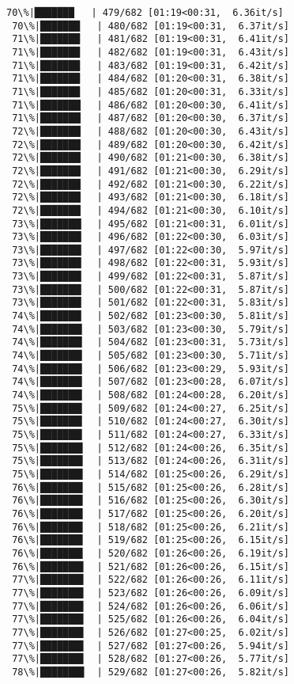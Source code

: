 \documentclass[11pt]{article}
\begin{document}
\begin{Verbatim}[commandchars=\\\{\}]
 70\%|███████   | 479/682 [01:19<00:31,  6.36it/s]
 70\%|███████   | 480/682 [01:19<00:31,  6.37it/s]
 71\%|███████   | 481/682 [01:19<00:31,  6.41it/s]
 71\%|███████   | 482/682 [01:19<00:31,  6.43it/s]
 71\%|███████   | 483/682 [01:19<00:31,  6.42it/s]
 71\%|███████   | 484/682 [01:20<00:31,  6.38it/s]
 71\%|███████   | 485/682 [01:20<00:31,  6.33it/s]
 71\%|███████▏  | 486/682 [01:20<00:30,  6.41it/s]
 71\%|███████▏  | 487/682 [01:20<00:30,  6.37it/s]
 72\%|███████▏  | 488/682 [01:20<00:30,  6.43it/s]
 72\%|███████▏  | 489/682 [01:20<00:30,  6.42it/s]
 72\%|███████▏  | 490/682 [01:21<00:30,  6.38it/s]
 72\%|███████▏  | 491/682 [01:21<00:30,  6.29it/s]
 72\%|███████▏  | 492/682 [01:21<00:30,  6.22it/s]
 72\%|███████▏  | 493/682 [01:21<00:30,  6.18it/s]
 72\%|███████▏  | 494/682 [01:21<00:30,  6.10it/s]
 73\%|███████▎  | 495/682 [01:21<00:31,  6.01it/s]
 73\%|███████▎  | 496/682 [01:22<00:30,  6.03it/s]
 73\%|███████▎  | 497/682 [01:22<00:30,  5.97it/s]
 73\%|███████▎  | 498/682 [01:22<00:31,  5.93it/s]
 73\%|███████▎  | 499/682 [01:22<00:31,  5.87it/s]
 73\%|███████▎  | 500/682 [01:22<00:31,  5.87it/s]
 73\%|███████▎  | 501/682 [01:22<00:31,  5.83it/s]
 74\%|███████▎  | 502/682 [01:23<00:30,  5.81it/s]
 74\%|███████▍  | 503/682 [01:23<00:30,  5.79it/s]
 74\%|███████▍  | 504/682 [01:23<00:31,  5.73it/s]
 74\%|███████▍  | 505/682 [01:23<00:30,  5.71it/s]
 74\%|███████▍  | 506/682 [01:23<00:29,  5.93it/s]
 74\%|███████▍  | 507/682 [01:23<00:28,  6.07it/s]
 74\%|███████▍  | 508/682 [01:24<00:28,  6.20it/s]
 75\%|███████▍  | 509/682 [01:24<00:27,  6.25it/s]
 75\%|███████▍  | 510/682 [01:24<00:27,  6.30it/s]
 75\%|███████▍  | 511/682 [01:24<00:27,  6.33it/s]
 75\%|███████▌  | 512/682 [01:24<00:26,  6.35it/s]
 75\%|███████▌  | 513/682 [01:24<00:26,  6.31it/s]
 75\%|███████▌  | 514/682 [01:25<00:26,  6.29it/s]
 76\%|███████▌  | 515/682 [01:25<00:26,  6.28it/s]
 76\%|███████▌  | 516/682 [01:25<00:26,  6.30it/s]
 76\%|███████▌  | 517/682 [01:25<00:26,  6.20it/s]
 76\%|███████▌  | 518/682 [01:25<00:26,  6.21it/s]
 76\%|███████▌  | 519/682 [01:25<00:26,  6.15it/s]
 76\%|███████▌  | 520/682 [01:26<00:26,  6.19it/s]
 76\%|███████▋  | 521/682 [01:26<00:26,  6.15it/s]
 77\%|███████▋  | 522/682 [01:26<00:26,  6.11it/s]
 77\%|███████▋  | 523/682 [01:26<00:26,  6.09it/s]
 77\%|███████▋  | 524/682 [01:26<00:26,  6.06it/s]
 77\%|███████▋  | 525/682 [01:26<00:26,  6.04it/s]
 77\%|███████▋  | 526/682 [01:27<00:25,  6.02it/s]
 77\%|███████▋  | 527/682 [01:27<00:26,  5.94it/s]
 77\%|███████▋  | 528/682 [01:27<00:26,  5.77it/s]
 78\%|███████▊  | 529/682 [01:27<00:26,  5.82it/s]

\end{Verbatim}
\end{document}
